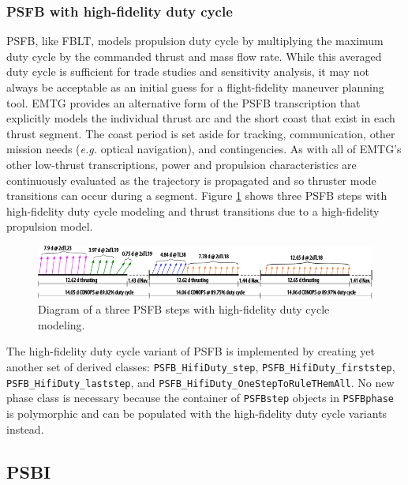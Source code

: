 \subsubsection{PSFB with high-fidelity duty cycle}
\label{subsubsec:PSFB_with_high_fidelity_duty_cycle}

\ac{PSFB}, like \ac{FBLT}, models propulsion duty cycle by multiplying the maximum duty cycle by the commanded thrust and mass flow rate. While this averaged duty cycle is sufficient for trade studies and sensitivity analysis, it may not always be acceptable as an initial guess for a flight-fidelity maneuver planning tool. \ac{EMTG} provides an alternative form of the \ac{PSFB} transcription that explicitly models the individual thrust arc and the short coast that exist in each thrust segment. The coast period is set aside for tracking, communication, other mission needs (\textit{e.g.} optical navigation), and contingencies. As with all of \ac{EMTG}'s other low-thrust transcriptions, power and propulsion characteristics are continuously evaluated as the trajectory is propagated and so thruster mode transitions can occur during a segment. Figure \ref{fig:PSFB_hifi_duty} shows three \ac{PSFB} steps with high-fidelity duty cycle modeling and thrust transitions due to a high-fidelity propulsion model.

\begin{figure}
	\centering
	\includegraphics[width=0.8\linewidth]{./mission/PSFB_hifi_duty_cycle.png}
	\caption{\label{fig:PSFB_hifi_duty} Diagram of a three \ac{PSFB} steps with high-fidelity duty cycle modeling.}
\end{figure}

The high-fidelity duty cycle variant of \ac{PSFB} is implemented by creating yet another set of derived classes: \texttt{PSFB\_HifiDuty\_step}, \texttt{PSFB\_HifiDuty\_firststep}, \texttt{PSFB\_HifiDuty\_laststep}, and \texttt{PSFB\_HifiDuty\_OneStepToRuleTHemAll}. No new phase class is necessary because the container of \texttt{PSFBstep} objects in \texttt{PSFBphase} is polymorphic and can be populated with the high-fidelity duty cycle variants instead.

\subsection{PSBI}
\label{subsec:PSBI}

